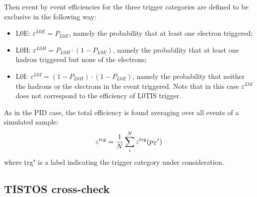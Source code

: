 Then event by event efficiencies for the three trigger categories are defined to be exclusive in the following way:
%
\begin{itemize}
\item L0E: $\varepsilon^{L0E} = P_{L0E}$, namely the probability that at least one electron triggered;
\item L0H: $\varepsilon^{L0H} = P_{L0H}\cdot(1 - P_{L0E})$, namely the probability that at least one hadron triggered but none of the electrons;
\item L0I: $\varepsilon^{L0I} = (1-P_{L0H})\cdot(1 - P_{L0E})$, namely the probability that neither the hadrons or the electrons in the event triggered. Note that in this case $\varepsilon^{L0I} $ does not correspond to the efficiency of L0TIS trigger.
\end{itemize}
%
As in the PID case, the total efficiency is found averaging over all events of a simulated sample:
%
\begin{equation}
\varepsilon^{\rm trg} = \frac{1}{N} \sum_i^N \varepsilon^{\rm trg}(\mbox{$p_{\rm T}$}^i)
\end{equation}
\noindent
where trg" is a label indicating the trigger category under consideration.

\subsection{TISTOS cross-check}
\label{sec:tistos}

